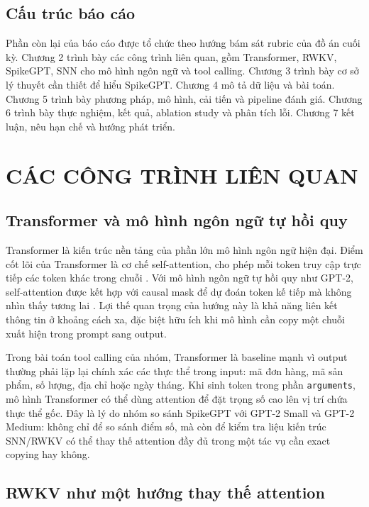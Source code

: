 \documentclass[12pt,a4paper,oneside]{report}
\newlength{\manualparindent}
\newcommand{\manualindent}{\hspace*{\manualparindent}}
\begin{document}
\section{Cấu trúc báo cáo}

\manualindent%
Phần còn lại của báo cáo được tổ chức theo hướng bám sát rubric của đồ án cuối kỳ. Chương 2 trình bày các công trình liên quan, gồm Transformer, RWKV, SpikeGPT, SNN cho mô hình ngôn ngữ và tool calling. Chương 3 trình bày cơ sở lý thuyết cần thiết để hiểu SpikeGPT. Chương 4 mô tả dữ liệu và bài toán. Chương 5 trình bày phương pháp, mô hình, cải tiến và pipeline đánh giá. Chương 6 trình bày thực nghiệm, kết quả, ablation study và phân tích lỗi. Chương 7 kết luận, nêu hạn chế và hướng phát triển.

\chapter{CÁC CÔNG TRÌNH LIÊN QUAN}

\section{Transformer và mô hình ngôn ngữ tự hồi quy}

\manualindent%
Transformer là kiến trúc nền tảng của phần lớn mô hình ngôn ngữ hiện đại. Điểm cốt lõi của Transformer là cơ chế self-attention, cho phép mỗi token truy cập trực tiếp các token khác trong chuỗi \cite{vaswani}. Với mô hình ngôn ngữ tự hồi quy như GPT-2, self-attention được kết hợp với causal mask để dự đoán token kế tiếp mà không nhìn thấy tương lai \cite{gpt2}. Lợi thế quan trọng của hướng này là khả năng liên kết thông tin ở khoảng cách xa, đặc biệt hữu ích khi mô hình cần copy một chuỗi xuất hiện trong prompt sang output.

\manualindent%
Trong bài toán tool calling của nhóm, Transformer là baseline mạnh vì output thường phải lặp lại chính xác các thực thể trong input: mã đơn hàng, mã sản phẩm, số lượng, địa chỉ hoặc ngày tháng. Khi sinh token trong phần \texttt{arguments}, mô hình Transformer có thể dùng attention để đặt trọng số cao lên vị trí chứa thực thể gốc. Đây là lý do nhóm so sánh SpikeGPT với GPT-2 Small và GPT-2 Medium: không chỉ để so sánh điểm số, mà còn để kiểm tra liệu kiến trúc SNN/RWKV có thể thay thế attention đầy đủ trong một tác vụ cần exact copying hay không.

\section{RWKV như một hướng thay thế attention}
\end{document}
